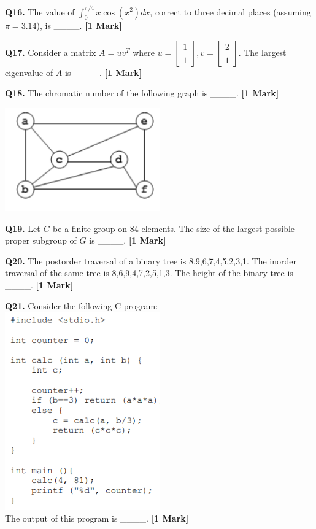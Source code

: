 \documentclass[11pt]{article}
\newcommand{\questiona}[2]{
    \noindent\textbf{Q#2.} #1 \hfill \textbf{[1 Mark]}
}
\begin{document}
\questiona{The value of \( \int_0^{\pi/4} x \cos(x^2) dx \), correct to three decimal places (assuming \( \pi = 3.14 \)), is \_\_\_\_.}{16}
\vspace{0.5cm}

\questiona{Consider a matrix \( A = uv^T \) where \( u = \begin{bmatrix} 1 \\\\ 1 \end{bmatrix}, v = \begin{bmatrix} 2 \\\\ 1 \end{bmatrix} \). The largest eigenvalue of \( A \) is \_\_\_\_.}{17}
\vspace{0.5cm}

\questiona{The chromatic number of the following graph is \_\_\_\_.}{18}
\includegraphics[width=0.5\textwidth]{figures/18}
\vspace{0.5cm}

\questiona{Let \( G \) be a finite group on 84 elements. The size of the largest possible proper subgroup of \( G \) is \_\_\_\_.}{19}
\vspace{0.5cm}

\questiona{The postorder traversal of a binary tree is 8,9,6,7,4,5,2,3,1. The inorder traversal of the same tree is 8,6,9,4,7,2,5,1,3. The height of the binary tree is \_\_\_\_.}{20}
\vspace{0.5cm}

\questiona{Consider the following C program:\\
\includegraphics[width=0.5\textwidth]{figures/21}\\
The output of this program is \_\_\_\_.}{21}
\vspace{0.5cm}
\end{document}
